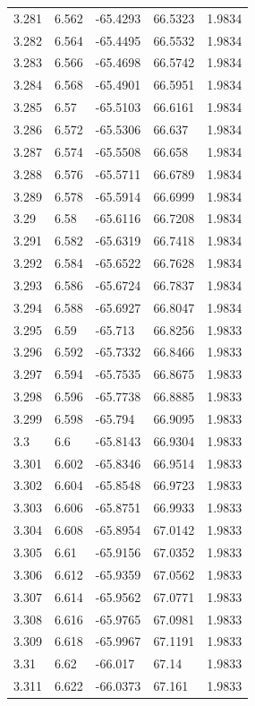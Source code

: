 \begin{tabular}{lllll}
3.281 & 6.562 & -65.4293 & 66.5323 & 1.9834 \\
3.282 & 6.564 & -65.4495 & 66.5532 & 1.9834 \\
3.283 & 6.566 & -65.4698 & 66.5742 & 1.9834 \\
3.284 & 6.568 & -65.4901 & 66.5951 & 1.9834 \\
3.285 & 6.57 & -65.5103 & 66.6161 & 1.9834 \\
3.286 & 6.572 & -65.5306 & 66.637 & 1.9834 \\
3.287 & 6.574 & -65.5508 & 66.658 & 1.9834 \\
3.288 & 6.576 & -65.5711 & 66.6789 & 1.9834 \\
3.289 & 6.578 & -65.5914 & 66.6999 & 1.9834 \\
3.29 & 6.58 & -65.6116 & 66.7208 & 1.9834 \\
3.291 & 6.582 & -65.6319 & 66.7418 & 1.9834 \\
3.292 & 6.584 & -65.6522 & 66.7628 & 1.9834 \\
3.293 & 6.586 & -65.6724 & 66.7837 & 1.9834 \\
3.294 & 6.588 & -65.6927 & 66.8047 & 1.9834 \\
3.295 & 6.59 & -65.713 & 66.8256 & 1.9833 \\
3.296 & 6.592 & -65.7332 & 66.8466 & 1.9833 \\
3.297 & 6.594 & -65.7535 & 66.8675 & 1.9833 \\
3.298 & 6.596 & -65.7738 & 66.8885 & 1.9833 \\
3.299 & 6.598 & -65.794 & 66.9095 & 1.9833 \\
3.3 & 6.6 & -65.8143 & 66.9304 & 1.9833 \\
3.301 & 6.602 & -65.8346 & 66.9514 & 1.9833 \\
3.302 & 6.604 & -65.8548 & 66.9723 & 1.9833 \\
3.303 & 6.606 & -65.8751 & 66.9933 & 1.9833 \\
3.304 & 6.608 & -65.8954 & 67.0142 & 1.9833 \\
3.305 & 6.61 & -65.9156 & 67.0352 & 1.9833 \\
3.306 & 6.612 & -65.9359 & 67.0562 & 1.9833 \\
3.307 & 6.614 & -65.9562 & 67.0771 & 1.9833 \\
3.308 & 6.616 & -65.9765 & 67.0981 & 1.9833 \\
3.309 & 6.618 & -65.9967 & 67.1191 & 1.9833 \\
3.31 & 6.62 & -66.017 & 67.14 & 1.9833 \\
3.311 & 6.622 & -66.0373 & 67.161 & 1.9833 \\

\end{tabular}
